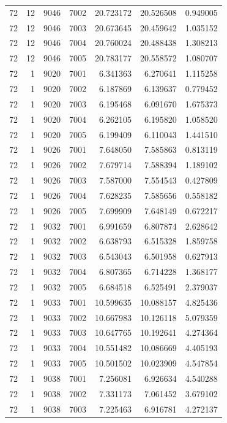 \begin{table}
\begin{tabular}{rrrrrrr}
72 & 12 & 9046 & 7002 & 20.723172 & 20.526508 & 0.949005 \\
72 & 12 & 9046 & 7003 & 20.673645 & 20.459642 & 1.035152 \\
72 & 12 & 9046 & 7004 & 20.760024 & 20.488438 & 1.308213 \\
72 & 12 & 9046 & 7005 & 20.783177 & 20.558572 & 1.080707 \\
72 & 1 & 9020 & 7001 & 6.341363 & 6.270641 & 1.115258 \\
72 & 1 & 9020 & 7002 & 6.187869 & 6.139637 & 0.779452 \\
72 & 1 & 9020 & 7003 & 6.195468 & 6.091670 & 1.675373 \\
72 & 1 & 9020 & 7004 & 6.262105 & 6.195820 & 1.058520 \\
72 & 1 & 9020 & 7005 & 6.199409 & 6.110043 & 1.441510 \\
72 & 1 & 9026 & 7001 & 7.648050 & 7.585863 & 0.813119 \\
72 & 1 & 9026 & 7002 & 7.679714 & 7.588394 & 1.189102 \\
72 & 1 & 9026 & 7003 & 7.587000 & 7.554543 & 0.427809 \\
72 & 1 & 9026 & 7004 & 7.628235 & 7.585656 & 0.558182 \\
72 & 1 & 9026 & 7005 & 7.699909 & 7.648149 & 0.672217 \\
72 & 1 & 9032 & 7001 & 6.991659 & 6.807874 & 2.628642 \\
72 & 1 & 9032 & 7002 & 6.638793 & 6.515328 & 1.859758 \\
72 & 1 & 9032 & 7003 & 6.543043 & 6.501958 & 0.627913 \\
72 & 1 & 9032 & 7004 & 6.807365 & 6.714228 & 1.368177 \\
72 & 1 & 9032 & 7005 & 6.684518 & 6.525491 & 2.379037 \\
72 & 1 & 9033 & 7001 & 10.599635 & 10.088157 & 4.825436 \\
72 & 1 & 9033 & 7002 & 10.667983 & 10.126118 & 5.079359 \\
72 & 1 & 9033 & 7003 & 10.647765 & 10.192641 & 4.274364 \\
72 & 1 & 9033 & 7004 & 10.551482 & 10.086669 & 4.405193 \\
72 & 1 & 9033 & 7005 & 10.501502 & 10.023909 & 4.547854 \\
72 & 1 & 9038 & 7001 & 7.256081 & 6.926634 & 4.540288 \\
72 & 1 & 9038 & 7002 & 7.331173 & 7.061452 & 3.679102 \\
72 & 1 & 9038 & 7003 & 7.225463 & 6.916781 & 4.272137 \\

\end{tabular}
\end{table}
